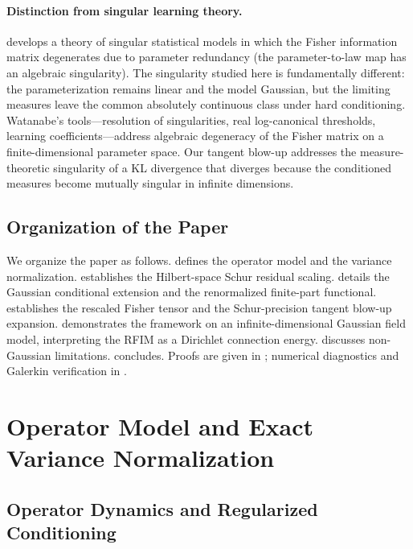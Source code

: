 \documentclass[11pt]{amsart}
\theoremstyle{plain}
\theoremstyle{definition}
\theoremstyle{remark}
\begin{document}
    \paragraph{Distinction from singular learning theory.}
    \cite{watanabe2009algebraic} develops a theory of singular statistical models in which the Fisher information matrix degenerates due to parameter redundancy (the parameter-to-law map has an algebraic singularity). The singularity studied here is fundamentally different: the parameterization remains linear and the model Gaussian, but the limiting measures leave the common absolutely continuous class under hard conditioning. Watanabe's tools---resolution of singularities, real log-canonical thresholds, learning coefficients---address algebraic degeneracy of the Fisher matrix on a finite-dimensional parameter space. Our tangent blow-up addresses the measure-theoretic singularity of a KL divergence that diverges because the conditioned measures become mutually singular in infinite dimensions.

    \subsection{Organization of the Paper}
    We organize the paper as follows.  defines the operator model and the variance normalization.  establishes the Hilbert-space Schur residual scaling.  details the Gaussian conditional extension and the renormalized finite-part functional.  establishes the rescaled Fisher tensor and the Schur-precision tangent blow-up expansion.  demonstrates the framework on an infinite-dimensional Gaussian field model, interpreting the RFIM as a Dirichlet connection energy.  discusses non-Gaussian limitations.  concludes. Proofs are given in ; numerical diagnostics and Galerkin verification in .
    \section{Operator Model and Exact Variance Normalization}
    \label{sec:setup}

    \subsection{Operator Dynamics and Regularized Conditioning}
    \label{sec:setup:dynamics}
\end{document}
